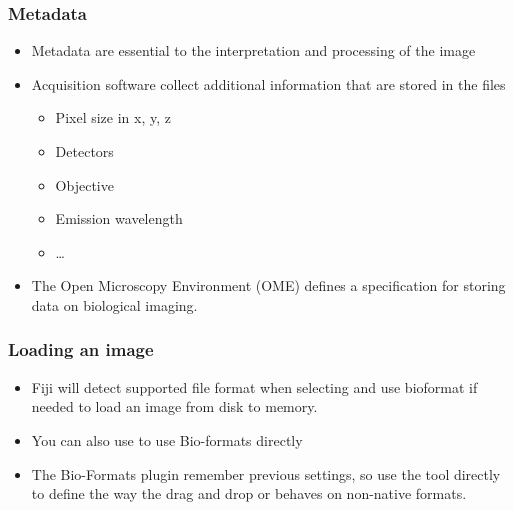 \documentclass[ignorenonframetext,aspectratio=169,10pt,xcolor=table]{beamer}
\begin{document}
\begin{frame} \frametitle{Metadata}

  \begin {itemize} \setlength\itemsep{1em}
    \item Metadata are essential to the interpretation and processing of
      the image
    \item Acquisition software collect additional information that are
      stored in the files
    \begin{itemize}
      \item Pixel size in x, y, z
      \item Detectors
      \item Objective
      \item Emission wavelength
      \item \dots
     \end{itemize}
    \item The Open Microscopy Environment (OME) defines a specification
    for storing data on biological imaging.
  \end{itemize}


\end{frame}

\begin{frame} \frametitle{Loading an image}
  \begin{itemize} \setlength\itemsep{2em}
  \item Fiji will detect supported file format when selecting
     and use bioformat if needed to load an image from
    disk to memory.
  \item You can also use  to use Bio-formats directly
  \item The Bio-Formats plugin remember previous settings, so use
    the tool directly to define the way the drag and drop or
     behaves on non-native formats.
  \end{itemize}
\end{frame}
\end{document}
